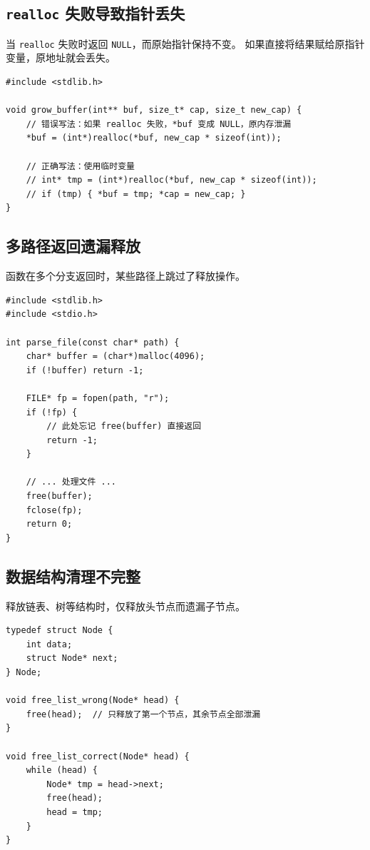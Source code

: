 \documentclass[12pt,a4paper,fontset=fandol]{ctexbook}
\begin{document}
\subsection{\texttt{realloc} 失败导致指针丢失}

当 \texttt{realloc} 失败时返回 \texttt{NULL}，而原始指针保持不变。
如果直接将结果赋给原指针变量，原地址就会丢失。

\begin{lstlisting}[style=cppstyle, caption={realloc 失败时的指针丢失}]
#include <stdlib.h>

void grow_buffer(int** buf, size_t* cap, size_t new_cap) {
    // 错误写法：如果 realloc 失败，*buf 变成 NULL，原内存泄漏
    *buf = (int*)realloc(*buf, new_cap * sizeof(int));

    // 正确写法：使用临时变量
    // int* tmp = (int*)realloc(*buf, new_cap * sizeof(int));
    // if (tmp) { *buf = tmp; *cap = new_cap; }
}
\end{lstlisting}

\subsection{多路径返回遗漏释放}

函数在多个分支返回时，某些路径上跳过了释放操作。

\begin{lstlisting}[style=cppstyle, caption={多路径返回导致泄漏}]
#include <stdlib.h>
#include <stdio.h>

int parse_file(const char* path) {
    char* buffer = (char*)malloc(4096);
    if (!buffer) return -1;

    FILE* fp = fopen(path, "r");
    if (!fp) {
        // 此处忘记 free(buffer) 直接返回
        return -1;
    }

    // ... 处理文件 ...
    free(buffer);
    fclose(fp);
    return 0;
}
\end{lstlisting}

\subsection{数据结构清理不完整}

释放链表、树等结构时，仅释放头节点而遗漏子节点。

\begin{lstlisting}[style=cppstyle, caption={链表释放不完整}]
typedef struct Node {
    int data;
    struct Node* next;
} Node;

void free_list_wrong(Node* head) {
    free(head);  // 只释放了第一个节点，其余节点全部泄漏
}

void free_list_correct(Node* head) {
    while (head) {
        Node* tmp = head->next;
        free(head);
        head = tmp;
    }
}
\end{lstlisting}
\end{document}
